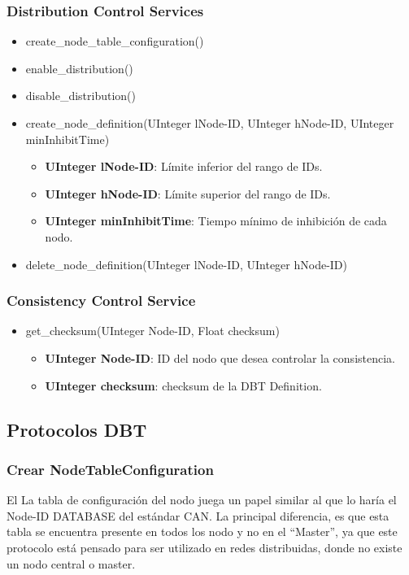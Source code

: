 \subsubsection{Distribution Control Services}
\begin{itemize}
  \item create\_node\_table\_configuration()
  \item enable\_distribution()
  \item disable\_distribution()
  \item create\_node\_definition(UInteger lNode-ID, UInteger hNode-ID, UInteger minInhibitTime)
    \begin{itemize}
    \item \textbf{UInteger lNode-ID}: Límite inferior del rango de IDs.
    \item \textbf{UInteger hNode-ID}: Límite superior del rango de IDs.
    \item \textbf{UInteger minInhibitTime}: Tiempo mínimo de inhibición de cada
      nodo.
    \end{itemize}
  \item delete\_node\_definition(UInteger lNode-ID, UInteger hNode-ID)
\end{itemize}

\subsubsection{Consistency Control Service}

\begin{itemize}
\item get\_checksum(UInteger Node-ID, Float checksum)
  \begin{itemize}
      \item \textbf{UInteger Node-ID}: ID del nodo que desea controlar la
    consistencia.
      \item \textbf{UInteger checksum}: checksum de la DBT Definition.
  \end{itemize}
\end{itemize}


\subsection{Protocolos DBT}
\subsubsection{Crear NodeTableConfiguration}
El La tabla de configuración del nodo juega un papel similar al que lo haría el
Node-ID DATABASE del estándar CAN. La principal diferencia, es que esta tabla
se encuentra presente en todos los nodo y no en el ``Master'', ya que este
protocolo está pensado para ser utilizado en redes distribuidas, donde no
existe un nodo central o master.

